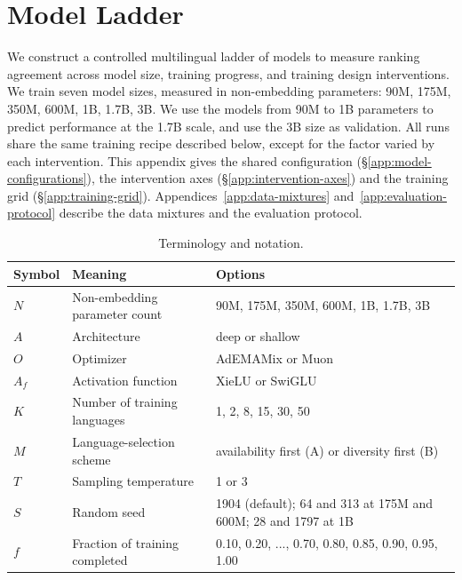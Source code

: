 \section{Model Ladder}
\label{app:model-ladder}
\label{app:models}

We construct a controlled multilingual ladder of \nmodels models to measure ranking agreement across model size, training progress, and training design interventions. 
We train seven model sizes, measured in non-embedding parameters: 90M, 175M, 350M, 600M, 1B, 1.7B, 3B. We use the models from 90M to 1B parameters to predict performance at the 1.7B scale, and use the 3B size as validation.
All runs share the same training recipe described below, except for the factor varied by each intervention. 
This appendix gives the shared configuration (\S\ref{app:model-configurations}), the intervention axes (\S\ref{app:intervention-axes}) and the training grid (\S\ref{app:training-grid}). Appendices~\ref{app:data-mixtures} and~\ref{app:evaluation-protocol} describe the data mixtures and the evaluation protocol.

\begin{table}[th]
    \centering
    \begin{tabular}{lll}
        \toprule
        \textbf{Symbol} & \textbf{Meaning} & \textbf{Options} \\
        \hline
        \(N\) & Non-embedding parameter count & 90M, 175M, 350M, 600M, 1B, 1.7B, 3B \\
        \hline
        \(A\) & Architecture & deep or shallow \\
        \hline
        \(O\) & Optimizer & AdEMAMix or Muon \\
        \hline
        \(A_f\) & Activation function & XieLU or SwiGLU \\
        \hline
        \(K\) & Number of training languages & 1, 2, 8, 15, 30, 50 \\
        \hline
        \(M\) & Language-selection scheme & availability first (A) or diversity first (B) \\
        \hline
        \(T\) & Sampling temperature & 1 or 3 \\
        \hline
        \(S\) & Random seed & 1904 (default); 64 and 313 at 175M and 600M; 28 and 1797 at 1B \\
        \hline
        \(f\) & Fraction of training completed & 0.10, 0.20, ..., 0.70, 0.80, 0.85, 0.90, 0.95, 1.00 \\
        \bottomrule
    \end{tabular}
    \caption{Terminology and notation.}
    \label{tab:notation-models}
\end{table}

